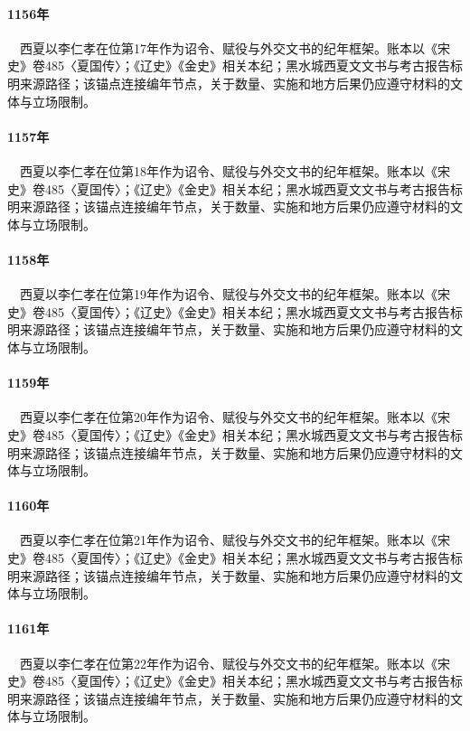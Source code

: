\paragraph{1156年}　西夏以李仁孝在位第17年作为诏令、赋役与外交文书的纪年框架。账本以《宋史》卷485〈夏国传〉；《辽史》《金史》相关本纪；黑水城西夏文文书与考古报告标明来源路径；该锚点连接编年节点，关于数量、实施和地方后果仍应遵守材料的文体与立场限制。

\paragraph{1157年}　西夏以李仁孝在位第18年作为诏令、赋役与外交文书的纪年框架。账本以《宋史》卷485〈夏国传〉；《辽史》《金史》相关本纪；黑水城西夏文文书与考古报告标明来源路径；该锚点连接编年节点，关于数量、实施和地方后果仍应遵守材料的文体与立场限制。

\paragraph{1158年}　西夏以李仁孝在位第19年作为诏令、赋役与外交文书的纪年框架。账本以《宋史》卷485〈夏国传〉；《辽史》《金史》相关本纪；黑水城西夏文文书与考古报告标明来源路径；该锚点连接编年节点，关于数量、实施和地方后果仍应遵守材料的文体与立场限制。

\paragraph{1159年}　西夏以李仁孝在位第20年作为诏令、赋役与外交文书的纪年框架。账本以《宋史》卷485〈夏国传〉；《辽史》《金史》相关本纪；黑水城西夏文文书与考古报告标明来源路径；该锚点连接编年节点，关于数量、实施和地方后果仍应遵守材料的文体与立场限制。

\paragraph{1160年}　西夏以李仁孝在位第21年作为诏令、赋役与外交文书的纪年框架。账本以《宋史》卷485〈夏国传〉；《辽史》《金史》相关本纪；黑水城西夏文文书与考古报告标明来源路径；该锚点连接编年节点，关于数量、实施和地方后果仍应遵守材料的文体与立场限制。

\paragraph{1161年}　西夏以李仁孝在位第22年作为诏令、赋役与外交文书的纪年框架。账本以《宋史》卷485〈夏国传〉；《辽史》《金史》相关本纪；黑水城西夏文文书与考古报告标明来源路径；该锚点连接编年节点，关于数量、实施和地方后果仍应遵守材料的文体与立场限制。

